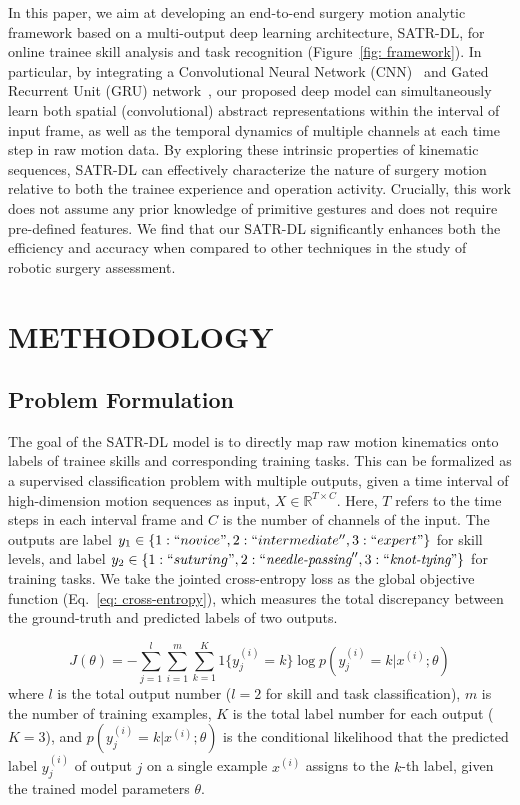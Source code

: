 \documentclass[letterpaper, 10 pt, conference, twoside]{IEEEtran}
\begin{document}
In this paper, we aim at developing an end-to-end surgery motion analytic framework based on a multi-output deep learning architecture, SATR-DL, for online trainee skill analysis and task recognition (Figure~\ref{fig: framework}). In particular, by integrating a Convolutional Neural Network (CNN)~\cite{szegedy2015going} and Gated Recurrent Unit (GRU) network~\cite{chung2014empirical}, our proposed deep model can simultaneously learn both spatial (convolutional) abstract representations within the interval of input frame, as well as the temporal dynamics of multiple channels at each time step in raw motion data.
By exploring these intrinsic properties of kinematic sequences, SATR-DL can effectively characterize the nature of surgery motion relative to both the trainee experience and operation activity. 
Crucially, this work does not assume any prior knowledge of primitive gestures and does not require pre-defined features.
We find that our SATR-DL significantly enhances both the efficiency and accuracy when compared to other techniques in the study of robotic surgery assessment.   
  
\section{METHODOLOGY}
\subsection{Problem Formulation}

The goal of the SATR-DL model is to directly map raw motion kinematics onto labels of trainee skills and corresponding training tasks. This can be formalized as a supervised classification problem with multiple outputs, given a time interval of high-dimension motion sequences as input, $X\in\mathbb{R}^{T\times C}$. Here, $T$ refers to the time steps in each interval frame and $C$ is the number of channels of the input. The outputs are label $y_1 \in \{1 :``novice", 2:``intermediate'', 3 :``expert" \}$ for skill levels, and label $y_2 \in \{1 :``suturing", 2:``\textit{needle-passing}'', 3 :``\textit{knot-tying}" \}$ for training tasks. 
We take the jointed cross-entropy loss as the global objective function (Eq.~\ref{eq: cross-entropy}), which measures the total discrepancy between the ground-truth and predicted labels of two outputs.

\vspace{-0.4cm}

\begin{equation}
\label{eq: cross-entropy}
J(\theta) = -\displaystyle\sum_{j=1}^{l} \displaystyle\sum_{i=1}^{m}\displaystyle\sum_{k=1}^{K}{ 1 \{y_{j}^{(i)}=k \}  \log{p(y_{j}^{(i)}=k | x^{(i)}; \theta )} }
\end{equation} 
where $l$ is the total output number ($l=2$ for skill and task classification), $m$ is the number of training examples, $K$ is the total label number for each output ($K=3$), and $p(y_{j}^{(i)}=k | x^{(i)}; \theta)$ is the conditional likelihood that the predicted label $y_{j}^{(i)}$ of output $j$ on a single example $x^{(i)}$ assigns to the $k$-th label, given the trained model parameters $\theta$.   
\end{document}
